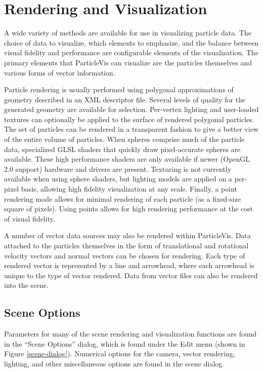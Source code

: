 \section{Rendering and Visualization}

A wide variety of methods are available for use in visualizing particle data.  The choice of data to visualize, which elements to emphasize, and the balance between visual fidelity and performance are configurable elements of the visualization.  The primary elements that ParticleVis can visualize are the particles themselves and various forms of vector information.

Particle rendering is usually performed using polygonal approximations of geometry described in an XML descriptor file.  Several levels of quality for the generated geometry are available for selection.  Per-vertex lighting and user-loaded textures can optionally be applied to the surface of rendered polygonal particles.  The set of particles can be rendered in a transparent fashion to give a better view of the entire volume of particles.
When spheres comprise much of the particle data, specialized GLSL shaders that quickly draw pixel-accurate spheres are available.  These high performance shaders are only available if newer (OpenGL 2.0 support) hardware and drivers are present.  Texturing is not currently available when using sphere shaders, but lighting models are applied on a per-pixel basis, allowing high fidelity visualization at any scale.  Finally, a point rendering mode allows for minimal rendering of each particle (as a fixed-size square of pixels).  Using points allows for high rendering performance at the cost of visual fidelity.

A number of vector data sources may also be rendered within ParticleVis.  Data attached to the particles themselves in the form of translational and rotational velocity vectors and normal vectors can be chosen for rendering.  Each type of rendered vector is represented by a line and arrowhead, where each arrowhead is unique to the type of vector rendered.  Data from vector files can also be rendered into the scene.

\subsection{Scene Options}
   Parameters for many of the scene rendering and visualization functions are found in the ``Scene Options'' dialog, which is found under the Edit menu (shown in Figure \ref{scene-dialog}).  Numerical options for the camera, vector rendering, lighting, and other miscellaneous options are found in the scene dialog.
   

